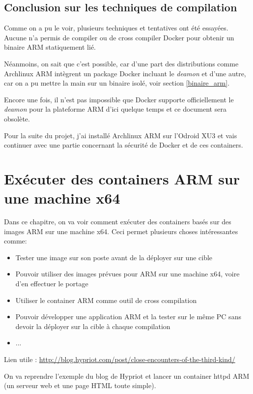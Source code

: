 \documentclass[11pt,a4paper,oneside]{report}
\begin{document}
\section{Conclusion sur les techniques de compilation}

Comme on a pu le voir, plusieurs techniques et tentatives ont été essayées. Aucune n'a permis de  compiler ou de cross compiler Docker pour obtenir un binaire ARM statiquement lié.

Néanmoins, on sait que c'est possible, car d'une part des distributions comme Archlinux ARM intègrent un package Docker incluant le \textit{deamon} et d'une autre, car on a pu mettre la main sur un binaire isolé, voir section \ref{binaire_arm}.

Encore une fois, il n'est pas impossible que Docker supporte officiellement le \textit{deamon} pour la plateforme ARM d'ici quelque temps et ce document sera obsolète.

Pour la suite du projet, j'ai installé Archlinux ARM sur l'Odroid XU3 et vais continuer avec une partie concernant la sécurité de Docker et de ces containers.

\chapter{Exécuter des containers ARM sur une machine x64}\label{executer_containers_arm_sur_x64}

Dans ce chapitre, on va voir comment exécuter des containers basés sur des images ARM sur une machine x64. Ceci permet plusieurs choses intéressantes comme:

\begin{itemize}
\item Tester une image sur son poste avant de la déployer sur une cible
\item Pouvoir utiliser des images prévues pour ARM sur une machine x64, voire d'en effectuer le portage
\item Utiliser le container ARM comme outil de cross compilation
\item Pouvoir développer une application ARM et la tester sur le même PC sans devoir la déployer sur la cible à chaque compilation
\item ...
\end{itemize}


Lien utile : \url{http://blog.hypriot.com/post/close-encounters-of-the-third-kind/}

On va reprendre l'exemple du blog de Hypriot et lancer un container httpd ARM (un serveur web et une page HTML toute simple).
\end{document}
